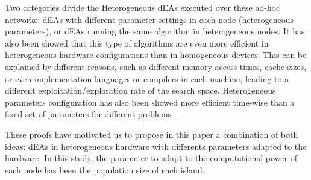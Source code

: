 \documentclass[final,1p,times]{elsarticle}
\begin{document}
Two categories divide the Heterogeneous dEAs executed over these ad-hoc networks: dEAs with different parameter settings
in each node 
(heterogeneous parameters), or dEAs running the same algorithm in heterogeneous nodes. It  has also been
showed \cite{HETEROGENEOUSHARD} that this type of algorithms are even
more efficient in heterogeneous hardware configurations than in
homogeneous devices. This can be explained by different reasons, such
as different memory access times, cache sizes, %
or even implementation
languages or compilers in each machine, leading to a different
exploitation/exploration rate of the search space. %
Heterogeneous parameters
configuration  has also been showed more  efficient time-wise than a fixed
set %
of parameters for different problems
\cite{HETEROGENEOUSPARAMETERS}.   %

These proofs have motivated us to propose in this paper a combination of both ideas: dEAs in heterogeneous hardware with differents parameters adapted to the hardware. In this study, the parameter to adapt to the computational power of each node has been the population size of each island.

\end{document}

